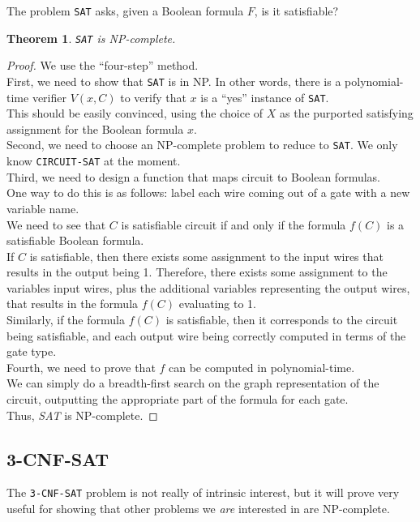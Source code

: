 \documentclass[12pt]{article}
\theoremstyle{plain}
\newtheorem{theorem}{Theorem}[subsection]
\theoremstyle{definition}
\begin{document}
The problem \texttt{SAT} asks, given a Boolean formula $F$, is it satisfiable?
\begin{theorem}
\texttt{SAT} is NP-complete.
\end{theorem}
\begin{proof}
We use the ``four-step'' method. \\
First, we need to show that \texttt{SAT} is in NP.
In other words, there is a polynomial-time verifier $V(x, C)$ to verify that $x$ is a ``yes'' instance of \texttt{SAT}. \\
This should be easily convinced, using the choice of $X$ as the purported satisfying assignment for the Boolean formula $x$. \\

Second, we need to choose an NP-complete problem to reduce to \texttt{SAT}.
We only know \texttt{CIRCUIT-SAT} at the moment. \\

Third, we need to design a function that maps circuit to Boolean formulas. \\
One way to do this is as follows: label each wire coming out of a gate with a new variable name. \\
We need to see that $C$ is satisfiable circuit if and only if the formula $f(C)$ is a satisfiable Boolean formula. \\
If $C$ is satisfiable, then there exists some assignment to the input wires that results in the output being 1.
Therefore, there exists some assignment to the variables input wires, plus the additional variables representing the output wires, that results in the formula $f(C)$ evaluating to 1. \\
Similarly, if the formula $f(C)$ is satisfiable, then it corresponds to the circuit being satisfiable, and each output wire being correctly computed in terms of the gate type. \\

Fourth, we need to prove that $f$ can be computed in polynomial-time. \\
We can simply do a breadth-first search on the graph representation of the circuit, outputting the appropriate part of the formula for each gate. \\

Thus, \emph{SAT} is NP-complete.
\end{proof}

\subsection{3-CNF-SAT}
The \texttt{3-CNF-SAT} problem is not really of intrinsic interest, but it will prove very useful for showing that other problems we \emph{are} interested in are NP-complete. \\
\end{document}
